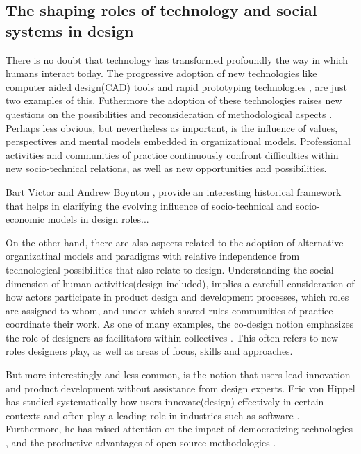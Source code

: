 \documentclass{ICED-Paper}%
\begin{document}
\subsection{The shaping roles of technology and social systems in design}
There is no doubt that technology has transformed profoundly the way in which humans interact today. The progressive adoption of new technologies like computer aided design(CAD) tools and rapid prototyping technologies \cite{CAD_review}, are just two examples of this. Futhermore the adoption of these technologies raises new questions on the possibilities and reconsideration of methodological aspects \cite{CAD_Method}.
Perhaps less obvious, but nevertheless as important, is the influence of values, perspectives and mental models embedded in organizational models. Professional activities and communities of practice continuously confront difficulties within new socio-technical relations, as well as new opportunities and possibilities\cite{ExpansiveDesign}.

Bart Victor and Andrew Boynton \cite{InventedHere}, provide an interesting historical framework that helps in clarifying the evolving influence of socio-technical and socio-economic models in design roles...

On the other hand, there are also aspects related to the adoption of alternative organizatinal models and paradigms with relative independence from technological possibilities that also relate to design. Understanding the social dimension of human activities(design included), implies  a carefull consideration of how actors participate in product design and development processes, which roles are assigned to whom, and under which shared rules communities of practice coordinate their work.
As one of many examples, the co-design notion emphasizes the role of designers as facilitators within collectives \cite{Codesign}. This often refers to new roles designers play, as well as areas of focus, skills and approaches.

But more interestingly and less common, is the notion that users lead innovation and product development without assistance from design experts. Eric von Hippel has studied systematically how users innovate(design) effectively in certain contexts\cite{hippel_1} and often play a leading role in industries such as software \cite{OpenSource}. Furthermore, he has raised attention on the impact of democratizing technologies \cite{hippel_2}, and the productive advantages of open source methodologies \cite{}.
\end{document}
